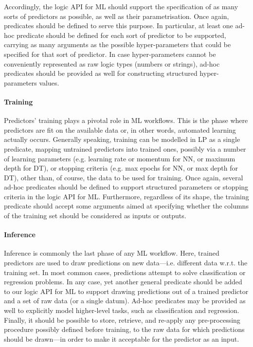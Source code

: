 \documentclass[runningheads]{llncs}
\begin{document}
Accordingly, the logic API for ML should support the specification of as many sorts of predictors as possible, as well as their parametrisation.
%
Once again, predicates should be defined to serve this purpose.
%
In particular, at least one ad-hoc predicate should be defined for each sort of predictor to be supported, carrying as many arguments as the possible hyper-parameters that could be specified for that sort of predictor.
%
In case hyper-parameters cannot be conveniently represented as raw logic types (numbers or strings), ad-hoc predicates should be provided as well for constructing structured hyper-parameters values.


\paragraph{Training}
%
Predictors' training plays a pivotal role in ML workflows.
%
This is the phase where predictors are fit on the available data or, in other words, automated learning actually occurs.
%
Generally speaking, training can be modelled in LP as a single predicate, mapping untrained predictors into trained ones, possibly via a number of learning parameters (e.g. learning rate or momentum for NN, or maximum depth for DT), or stopping criteria (e.g. max epochs for NN, or max depth for DT), other than, of course, the data to be used for training.
%
Once again, several ad-hoc predicates should be defined to support structured parameters or stopping criteria in the logic API for ML.
%
Furthermore, regardless of its shape, the training predicate should accept some arguments aimed at specifying whether the columns of the training set should be considered as inputs or outputs.

\paragraph{Inference}
%
Inference is commonly the last phase of any ML workflow.
%
Here, trained predictors are used to draw predictions on new data---i.e. different data w.r.t. the training set.
%
%
In most common cases, predictions attempt to solve classification or regression problems.
%
In any case, yet another general predicate should be added to our logic API for ML to support drawing predictions out of a trained predictor and a set of raw data (or a single datum).
%
Ad-hoc predicates may be provided as well to explicitly model higher-level tasks, such as classification and regression.
%
Finally, it should be possible to store, retrieve, and re-apply any pre-processing procedure possibly defined before training, to the raw data for which predictions should be drawn---in order to make it acceptable for the predictor as an input.
\end{document}
